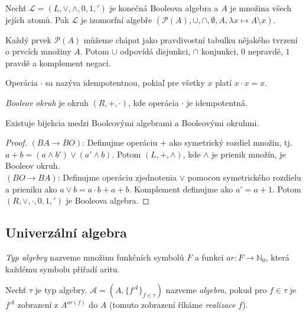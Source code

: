 \begin{theorem}
    Nechť $\mathcal{L} = (L, \vee, \wedge, 0, 1, {'})$
    je konečná Booleova algebra
    \linebreak
    a $A$ je množina všech jejích atomů.
    Pak $\mathcal{L}$ je izomorfní algebře
    \linebreak
    $(\mathcal{P}(A), \cup, \cap, \emptyset, A, \lambda x \mapsto A \setminus x)$.
\end{theorem}

Každý prvek $\mathcal{P}(A)$ můžeme chápat jako pravdivostní tabulku
nějakého tvrzení o prvcích množiny $A$. Potom $\cup$ odpovídá
disjunkci, $\cap$ konjunkci, $0$ nepravdě, $1$ pravdě a komplement
negaci.

Operácia $\cdot$ sa nazýva idempotentnou, pokiaľ pre všetky $x$ platí
$x \cdot x = x$.	

\begin{definition}
    {\em Booleov okruh} je okruh $(R,+,\cdot)$, kde operácia $\cdot$ 
	je idempotentná.
\end{definition}

\begin{theorem}
    Existuje bijekcia medzi Booleovými algebrami a Booleovými okruhmi.
\end{theorem}
\begin{proof}
	$(BA \to BO)$: Definujme operáciu $+$ ako symetrický rozdiel množín,
	tj. $a+b=(a \land b') \lor (a' \land b)$. Potom $(L, +, \land)$, kde
	$\land$ je prienik množín, je Booleov okruh.\\
	$(BO \to BA)$: Definujme operáciu zjednotenia $\lor$ pomocou symetrického
	rozdielu a prieniku ako $a \lor b = a \cdot b + a + b$. Komplement definujme
	ako $a'=a+1$. Potom $(R, \lor, \cdot, 0, 1, ')$ je Booleova algebra.
\end{proof}

\subsection{Univerzální algebra}

\begin{definition}
    {\em Typ algebry} nazveme množinu funkčních symbolů $F$ a
    funkci $ar : F \to \mathbb{N}_0$, která každému symbolu přiřadí aritu.
\end{definition}

\begin{definition}[Algebra]
    Nechť $\tau$ je typ algebry.
    $\mathcal{A} = (A, \{ f^\mathcal{A} \}_{f \in \tau})$
    nazveme {\em algebra}, pokud pro $f \in \tau$ je
    $f^\mathcal{A}$ zobrazení z $A^{ar(f)}$ do $A$ (tomuto zobrazení
    říkáme {\em realizace} $f$).
\end{definition}

